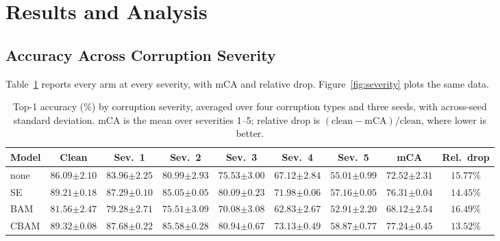 \documentclass[10pt]{article}
\begin{document}
\section{Results and Analysis}
\label{sec:results}

\subsection{Accuracy Across Corruption Severity}

Table~\ref{tab:main} reports every arm at every severity, with mCA and relative
drop. Figure~\ref{fig:severity} plots the same data.

\begin{table}[t]
  \centering
  \caption{Top-1 accuracy (\%) by corruption severity, averaged over four
  corruption types and three seeds, with across-seed standard deviation. mCA is
  the mean over severities 1--5; relative drop is
  $(\text{clean}-\text{mCA})/\text{clean}$, where lower is better.}
  \label{tab:main}
  \small
  \begin{tabular}{lcccccccc}
    \toprule
    Model & Clean & Sev.\ 1 & Sev.\ 2 & Sev.\ 3 & Sev.\ 4 & Sev.\ 5 & mCA & Rel.\ drop \\
    \midrule
    none & $86.09${\scriptsize$\pm2.10$} & $83.96${\scriptsize$\pm2.25$} & $80.99${\scriptsize$\pm2.93$} & $75.53${\scriptsize$\pm3.00$} & $67.12${\scriptsize$\pm2.84$} & $55.01${\scriptsize$\pm0.99$} & $72.52${\scriptsize$\pm2.31$} & $15.77\%$ \\
    SE   & $89.21${\scriptsize$\pm0.18$} & $87.29${\scriptsize$\pm0.10$} & $85.05${\scriptsize$\pm0.05$} & $80.09${\scriptsize$\pm0.23$} & $71.98${\scriptsize$\pm0.06$} & $57.16${\scriptsize$\pm0.05$} & $76.31${\scriptsize$\pm0.04$} & $14.45\%$ \\
    BAM  & $81.56${\scriptsize$\pm2.47$} & $79.28${\scriptsize$\pm2.71$} & $75.51${\scriptsize$\pm3.09$} & $70.08${\scriptsize$\pm3.08$} & $62.83${\scriptsize$\pm2.67$} & $52.91${\scriptsize$\pm2.20$} & $68.12${\scriptsize$\pm2.54$} & $16.49\%$ \\
    CBAM & $\mathbf{89.32}${\scriptsize$\pm0.08$} & $\mathbf{87.68}${\scriptsize$\pm0.22$} & $\mathbf{85.58}${\scriptsize$\pm0.28$} & $\mathbf{80.94}${\scriptsize$\pm0.67$} & $\mathbf{73.13}${\scriptsize$\pm0.49$} & $\mathbf{58.87}${\scriptsize$\pm0.77$} & $\mathbf{77.24}${\scriptsize$\pm0.45$} & $\mathbf{13.52\%}$ \\
    \bottomrule
  \end{tabular}
\end{table}
\end{document}
